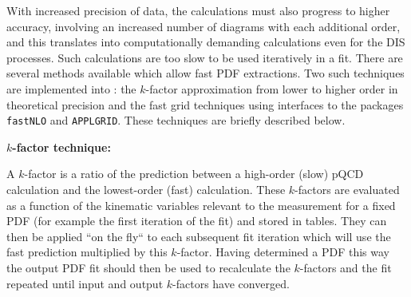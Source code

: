 
With increased precision of data, the calculations must also progress to higher accuracy, involving an increased number of diagrams with each 
additional order, and this translates into computationally demanding 
calculations even for the DIS processes. Such calculations 
are too slow to be used iteratively in a fit.
There are several methods available which allow fast PDF extractions.  
Two such techniques
are implemented into \fitter: the $k$-factor approximation from lower to higher order in theoretical precision and the fast grid techniques using interfaces to the 
packages \texttt{fastNLO} \rm and \texttt{APPLGRID}. These techniques are briefly described below.  


\begin{description}
\item \bf {$k$-factor technique:}\rm

A $k$-factor is a ratio of the prediction between a high-order (slow)
pQCD calculation and the lowest-order (fast) calculation.  These $k$-factors
are evaluated as a function of the kinematic variables relevant to
 the measurement 
for a fixed PDF (for example the first iteration of the fit) and stored in 
tables. They can then be applied ``on the fly`` to each subsequent fit 
iteration which will use the fast prediction multiplied by this $k$-factor.
Having determined a PDF this way the output PDF fit should then be used to 
recalculate the $k$-factors and the fit repeated until input and output 
$k$-factors have converged. 


\end{description}
